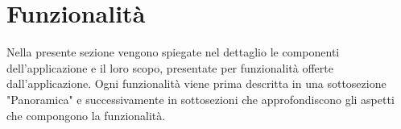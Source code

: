 \documentclass[../ManualeSviluppatore.tex]{subfiles}
\begin{document}
\section{Funzionalità}
	Nella presente sezione vengono spiegate nel dettaglio le componenti dell'applicazione e il loro scopo, presentate per funzionalità offerte dall'applicazione.
	Ogni funzionalità viene prima descritta in una sottosezione "Panoramica" e successivamente in sottosezioni che approfondiscono gli aspetti che compongono la funzionalità.
	
	
	
	
	
	
	
	
	
	
\end{document}

